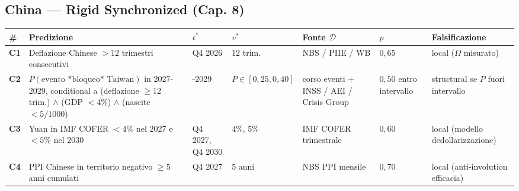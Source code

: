 \subsection{China --- Rigid Synchronized (Cap.
8)}\label{cina-rigido-sincronizzato-cap.-8}

{\def\LTcaptype{none} %
{\small\begin{longtable}[]{@{}
  >{\raggedright\arraybackslash}p{}
  >{\raggedright\arraybackslash}p{}
  >{\raggedright\arraybackslash}p{}
  >{\raggedright\arraybackslash}p{}
  >{\raggedright\arraybackslash}p{}
  >{\raggedright\arraybackslash}p{}
  >{\raggedright\arraybackslash}p{}@{}}
\toprule\noalign{}
\begin{minipage}[b]{\linewidth}\raggedright
\#
\end{minipage} & \begin{minipage}[b]{\linewidth}\raggedright
Predizione
\end{minipage} & \begin{minipage}[b]{\linewidth}\raggedright
\(t^*\)
\end{minipage} & \begin{minipage}[b]{\linewidth}\raggedright
\(v^*\)
\end{minipage} & \begin{minipage}[b]{\linewidth}\raggedright
Fonte \(\mathcal{D}\)
\end{minipage} & \begin{minipage}[b]{\linewidth}\raggedright
\(p\)
\end{minipage} & \begin{minipage}[b]{\linewidth}\raggedright
Falsificazione
\end{minipage} \\
\midrule\noalign{}
\endhead
\bottomrule\noalign{}
\endlastfoot
\textbf{C1} & Deflazione Chinese \(> 12\) trimestri consecutivi & Q4 2026
& \(12\) trim. & NBS / PIIE / WB & \(0{,}65\) & local (\(\Omega\)
misurato) \\
\textbf{C2} & \(P(\text{evento *bloqueo* Taiwan})\) in 2027-2029,
conditional a (deflazione \(\geq 12\) trim.) \(\wedge\) (GDP \(< 4\%\))
\(\wedge\) (nascite \(< 5/1000\)) & 2027-2029 &
\(P \in [0{,}25, 0{,}40]\) & corso eventi + INSS / AEI / Crisis Group &
\(0{,}50\) entro intervallo & structural se \(P\) fuori intervallo \\
\textbf{C3} & Yuan in IMF COFER \(< 4\%\) nel 2027 e \(< 5\%\) nel 2030
& Q4 2027, Q4 2030 & \(4\%\), \(5\%\) & IMF COFER trimestrale &
\(0{,}60\) & local (modello dedollarizzazione) \\
\textbf{C4} & PPI Chinese in territorio negativo \(\geq 5\) anni cumulati
& Q4 2027 & \(5\) anni & NBS PPI mensile & \(0{,}70\) & local
(anti-involution efficacia) \\
\end{longtable}}
}

